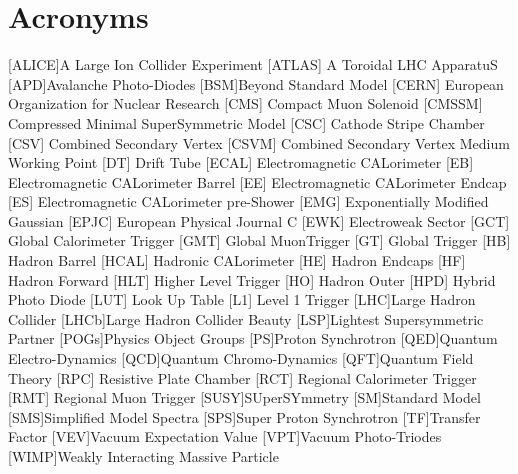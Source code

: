 
%



\newpage
\section*{Acronyms}

\begin{acronym}[AAAAAAA]
[ALICE]{A Large Ion Collider Experiment}
 [ATLAS] {A Toroidal LHC ApparatuS}
[APD]{Avalanche Photo-Diodes}
[BSM]{Beyond Standard Model}
 [CERN] {European Organization for Nuclear Research}
 [CMS] {Compact Muon Solenoid}
 [CMSSM] {Compressed Minimal SuperSymmetric Model}
 [CSC] {Cathode Stripe Chamber}
 [CSV] {Combined Secondary Vertex}
 [CSVM] {Combined Secondary Vertex Medium Working Point}
 [DT] {Drift Tube}
 [ECAL] {Electromagnetic CALorimeter}
 [EB] {Electromagnetic CALorimeter Barrel}
 [EE] {Electromagnetic CALorimeter Endcap}
 [ES] {Electromagnetic CALorimeter pre-Shower}
 [EMG] {Exponentially Modified Gaussian}
 [EPJC] {European Physical Journal C}
 [EWK] {Electroweak Sector}
 [GCT] {Global Calorimeter Trigger}
 [GMT] {Global MuonTrigger}
 [GT] {Global Trigger}
 [HB] {Hadron Barrel}
 [HCAL] {Hadronic CALorimeter}
 [HE] {Hadron Endcaps}
 [HF] {Hadron Forward}
[HLT] {Higher Level Trigger}
 [HO] {Hadron Outer}
 [HPD] {Hybrid Photo Diode}
 [LUT] {Look Up Table}
 [L1] {Level 1 Trigger}
[LHC]{Large Hadron Collider}
[LHCb]{Large Hadron Collider Beauty}
[LSP]{Lightest Supersymmetric Partner}
[POGs]{Physics Object Groups}
[PS]{Proton Synchrotron}
[QED]{Quantum Electro-Dynamics}
[QCD]{Quantum Chromo-Dynamics}
[QFT]{Quantum Field Theory}
 [RPC] {Resistive Plate Chamber}
 [RCT] {Regional Calorimeter Trigger}
 [RMT] {Regional Muon Trigger}
[SUSY]{SUperSYmmetry}
[SM]{Standard Model}
[SMS]{Simplified Model Spectra}
[SPS]{Super Proton Synchrotron}
[TF]{Transfer Factor}
[VEV]{Vacuum Expectation Value}
[VPT]{Vacuum Photo-Triodes}
[WIMP]{Weakly Interacting Massive Particle}

\end{acronym}


